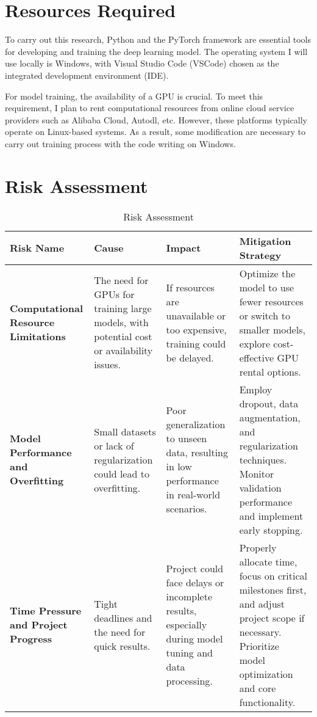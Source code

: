 \documentclass[a4paper,12pt]{article}
\begin{document}
\section*{Resources Required}
To carry out this research, Python and the PyTorch framework are essential tools for developing and training the deep learning model. The operating system I will use locally is Windows, with Visual Studio Code (VSCode) chosen as the integrated development environment (IDE).

For model training, the availability of a GPU is crucial. To meet this requirement, I plan to rent computational resources from online cloud service providers such as Alibaba Cloud, Autodl, etc. However, these platforms typically operate on Linux-based systems. As a result, some modification are necessary to carry out training process with the code writing on Windows.

\section*{Risk Assessment}

\begin{table}[htbp]
\centering
\begin{tabular}{|p{3cm}|p{3.5cm}|p{3.5cm}|p{4cm}|}
\hline
\textbf{Risk Name} & \textbf{Cause} & \textbf{Impact} & \textbf{Mitigation Strategy} \\
\hline
\textbf{Computational Resource Limitations} & The need for GPUs for training large models, with potential cost or availability issues. & If resources are unavailable or too expensive, training could be delayed. & Optimize the model to use fewer resources or switch to smaller models, explore cost-effective GPU rental options. \\
\hline
\textbf{Model Performance and Overfitting} & Small datasets or lack of regularization could lead to overfitting. & Poor generalization to unseen data, resulting in low performance in real-world scenarios. & Employ dropout, data augmentation, and regularization techniques. Monitor validation performance and implement early stopping. \\
\hline
\textbf{Time Pressure and Project Progress} & Tight deadlines and the need for quick results. & Project could face delays or incomplete results, especially during model tuning and data processing. & Properly allocate time, focus on critical milestones first, and adjust project scope if necessary. Prioritize model optimization and core functionality. \\
\hline
\end{tabular}
\caption{Risk Assessment}
\end{table}
\end{document}

